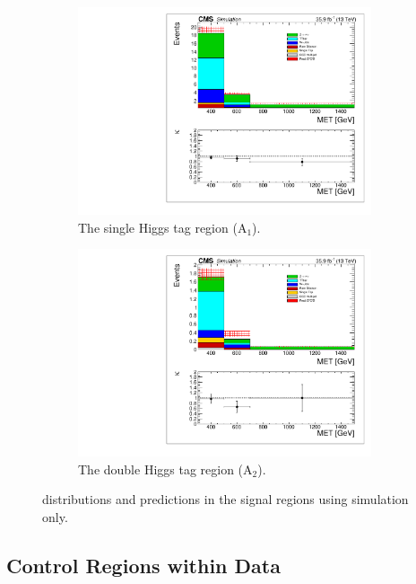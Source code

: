 \begin{figure}[hbp!]
\centering
\begin{subfigure}[b]{0.49\textwidth}
\centering
\includegraphics[trim={5px 5px 5px 5px},clip,width=0.95\textwidth]{figs/MCclosure_singleHiggsRegionTotal.pdf}
\caption{The single Higgs tag region (A$_{1}$).}
\end{subfigure}
\begin{subfigure}[b]{0.49\textwidth}
\centering
\includegraphics[trim={5px 5px 5px 5px},clip,width=0.95\textwidth]{figs/MCclosure_doubleHiggsRegionTotal.pdf} 
\caption{The double Higgs tag region (A$_{2}$).}
\end{subfigure}
\caption{\ptmiss distributions and predictions in the signal regions using simulation only.}
\label{fig:MCclosure}
\end{figure}

\subsection{Control Regions within Data}
\label{sec:smbkg}


